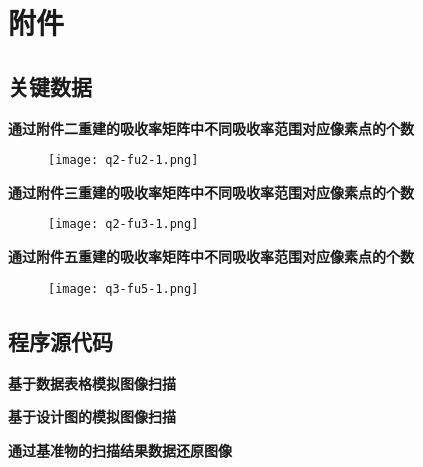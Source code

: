 \documentclass[withoutpreface,bwprint]{cumcmthesis} %
\begin{document}
\section{附件}
\subsection{关键数据}

\textbf{通过附件二重建的吸收率矩阵中不同吸收率范围对应像素点的个数}

\begin{figure}[h]
\small
\centering
\texttt{[image: q2-fu2-1.png]}
\caption{} \label{fig:q2-fu2-1}
\end{figure}
\newpage
\textbf{通过附件三重建的吸收率矩阵中不同吸收率范围对应像素点的个数}

\begin{figure}[h]
\small
\centering
\texttt{[image: q2-fu3-1.png]}
\caption{} \label{fig:q2-fu3-1}
\end{figure}
\newpage
\textbf{通过附件五重建的吸收率矩阵中不同吸收率范围对应像素点的个数}

\begin{figure}[h]
\small
\centering
\texttt{[image: q3-fu5-1.png]}
\caption{} \label{fig:q3-fu5-1}
\end{figure}
\newpage
\subsection{程序源代码}
\textbf{基于数据表格模拟图像扫描}


\textbf{基于设计图的模拟图像扫描}


\textbf{通过基准物的扫描结果数据还原图像}

\end{document}
